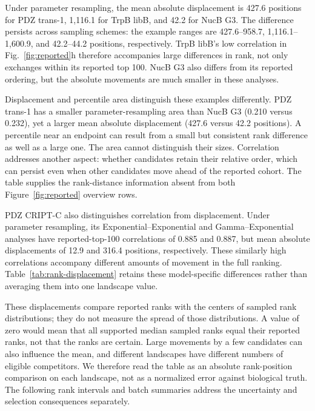 \documentclass[11pt]{article}
\begin{document}
Under parameter resampling, the mean absolute displacement is 427.6
positions for PDZ trans-1, 1,116.1 for TrpB libB, and 42.2 for NucB G3.
The difference persists across sampling schemes: the example ranges are
427.6--958.7, 1,116.1--1,600.9, and 42.2--44.2 positions, respectively.
TrpB libB's low correlation in Fig.~\ref{fig:reported}h therefore
accompanies large differences in rank, not only exchanges within its
reported top 100. NucB G3 also differs from its reported ordering, but
the absolute movements are much smaller in these analyses.

Displacement and percentile area distinguish these examples differently.
PDZ trans-1 has a smaller parameter-resampling area than NucB G3
(0.210 versus 0.232), yet a larger mean absolute displacement
(427.6 versus 42.2 positions). A percentile near an endpoint can
result from a small but consistent rank difference as well as a large
one. The area cannot distinguish their sizes. Correlation addresses
another aspect: whether candidates retain their relative order, which
can persist even when other candidates move ahead of the reported
cohort. The table supplies the rank-distance information absent from
both Figure~\ref{fig:reported} overview rows.

PDZ CRIPT-C also distinguishes correlation from displacement. Under
parameter resampling, its Exponential--Exponential and Gamma--Exponential
analyses have reported-top-100 correlations of 0.885 and 0.887,
but mean absolute displacements of 12.9 and 316.4 positions, respectively.
These similarly high correlations accompany different amounts of
movement in the full ranking.
Table~\ref{tab:rank-displacement} retains these model-specific
differences rather than averaging them into one landscape value.

These displacements compare reported ranks with the centers of sampled
rank distributions; they do not measure the spread of those distributions.
A value of zero would mean that all supported median sampled ranks equal
their reported ranks, not that the ranks are certain. Large movements
by a few candidates can also influence the mean, and different landscapes
have different numbers of eligible competitors. We therefore read the
table as an absolute rank-position comparison on each landscape, not
as a normalized error against biological truth. The following rank
intervals and batch summaries address the uncertainty and selection
consequences separately.

\clearpage

\end{document}
